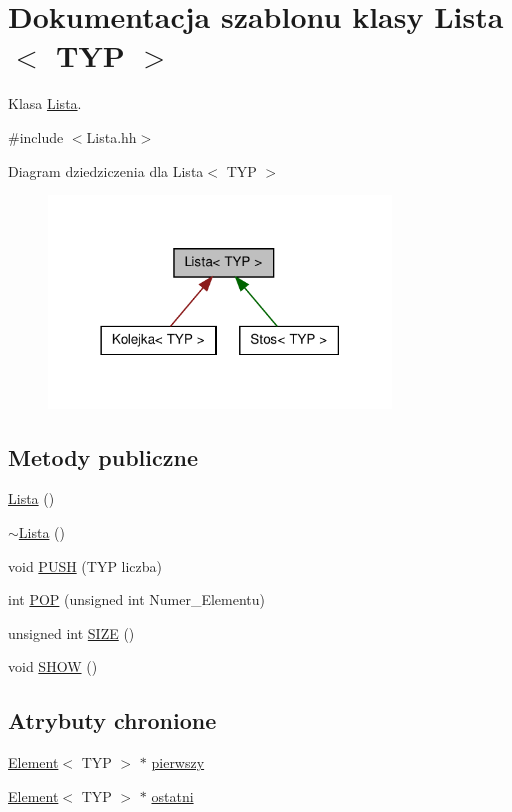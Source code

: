 \hypertarget{class_lista}{
\section{Dokumentacja szablonu klasy Lista$<$ TYP $>$}
\label{class_lista}
}


Klasa \hyperlink{class_lista}{Lista}.  




{\ttfamily \#include $<$Lista.hh$>$}



Diagram dziedziczenia dla Lista$<$ TYP $>$
\nopagebreak
\begin{figure}[H]
\begin{center}
\leavevmode
\includegraphics[width=258pt]{class_lista__inherit__graph}
\end{center}
\end{figure}
\subsection*{Metody publiczne}
\begin{DoxyCompactItemize}
\item 
\hyperlink{class_lista_ae2559bf0c96569265d5f9f7f9cd4cb3a}{Lista} ()
\item 
\hyperlink{class_lista_a7271d867e38a838c25ffb5aa6b73faef}{$\sim$Lista} ()
\item 
void \hyperlink{class_lista_a5c21bab22b627c729ad0c90e1f835901}{PUSH} (TYP liczba)
\item 
int \hyperlink{class_lista_a99390f363a7deceed9c99d717f578aaa}{POP} (unsigned int Numer\_\-Elementu)
\item 
unsigned int \hyperlink{class_lista_a4f10ca015c6b34a322dbc1c93e313c07}{SIZE} ()
\item 
void \hyperlink{class_lista_a89bbb449a047593eebce602a449ac1e7}{SHOW} ()
\end{DoxyCompactItemize}
\subsection*{Atrybuty chronione}
\begin{DoxyCompactItemize}
\item 
\hyperlink{class_element}{Element}$<$ TYP $>$ $\ast$ \hyperlink{class_lista_a8557ec530a4dcf731449d708426fe5d5}{pierwszy}
\item 
\hyperlink{class_element}{Element}$<$ TYP $>$ $\ast$ \hyperlink{class_lista_aefe3a0b196bd94713eebe3f9332011b1}{ostatni}
\end{DoxyCompactItemize}


